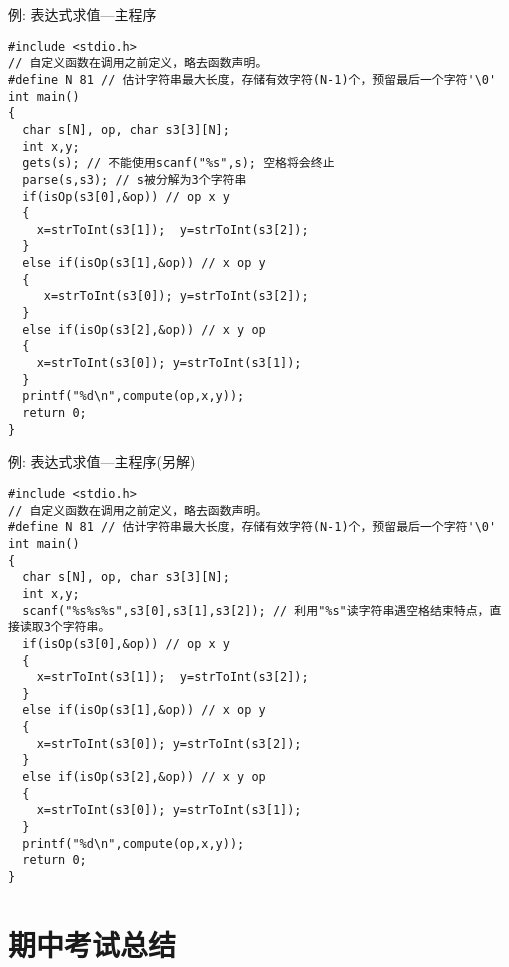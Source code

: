 \begin{frame}{例: 表达式求值---主程序}
\begin{lstlisting}
#include <stdio.h>
// 自定义函数在调用之前定义，略去函数声明。 
#define N 81 // 估计字符串最大长度，存储有效字符(N-1)个，预留最后一个字符'\0'
int main()
{
  char s[N], op, char s3[3][N];   
  int x,y;
  gets(s); // 不能使用scanf("%s",s); 空格将会终止
  parse(s,s3); // s被分解为3个字符串 
  if(isOp(s3[0],&op)) // op x y
  {
    x=strToInt(s3[1]);  y=strToInt(s3[2]);
  }
  else if(isOp(s3[1],&op)) // x op y
  {
     x=strToInt(s3[0]); y=strToInt(s3[2]);
  }
  else if(isOp(s3[2],&op)) // x y op
  {
    x=strToInt(s3[0]); y=strToInt(s3[1]);
  }
  printf("%d\n",compute(op,x,y)); 
  return 0;
}
\end{lstlisting}
\end{frame}

\begin{frame}{例: 表达式求值---主程序(另解)}
\begin{lstlisting}
#include <stdio.h>
// 自定义函数在调用之前定义，略去函数声明。
#define N 81 // 估计字符串最大长度，存储有效字符(N-1)个，预留最后一个字符'\0' 
int main()
{
  char s[N], op, char s3[3][N];   
  int x,y;
  scanf("%s%s%s",s3[0],s3[1],s3[2]); // 利用"%s"读字符串遇空格结束特点，直接读取3个字符串。
  if(isOp(s3[0],&op)) // op x y
  {
    x=strToInt(s3[1]);  y=strToInt(s3[2]);
  }
  else if(isOp(s3[1],&op)) // x op y
  {
    x=strToInt(s3[0]); y=strToInt(s3[2]);
  }
  else if(isOp(s3[2],&op)) // x y op
  {
    x=strToInt(s3[0]); y=strToInt(s3[1]);
  }
  printf("%d\n",compute(op,x,y)); 
  return 0;
}
\end{lstlisting}
\end{frame}

\section{期中考试总结}

